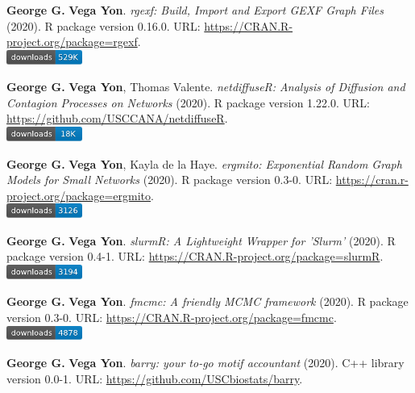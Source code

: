 \item {\bfseries George G.} {\bfseries Vega Yon}. \textit{rgexf: Build, Import and Export GEXF Graph Files} (2020). R package version 0.16.0. {\small URL}: \url{https://CRAN.R-project.org/package=rgexf}. \\\includegraphics[width=2.5cm]{fig/cran-downloads-rgexf.pdf} 
\item {\bfseries George G.} {\bfseries Vega Yon}, Thomas Valente. \textit{{{netdiffuseR: Analysis of Diffusion and Contagion Processes on Networks}}} (2020). R package version 1.22.0. {\small URL}: \url{https://github.com/USCCANA/netdiffuseR}. \\\includegraphics[width=2.5cm]{fig/cran-downloads-netdiffuser.pdf} 
\item {\bfseries George G.} {\bfseries Vega Yon}, Kayla de la Haye. \textit{ergmito: Exponential Random Graph Models for Small Networks} (2020). R package version 0.3-0. {\small URL}: \url{https://cran.r-project.org/package=ergmito}. \\\includegraphics[width=2.5cm]{fig/cran-downloads-ergmito.pdf} 
\item {\bfseries George G.} {\bfseries Vega Yon}. \textit{slurmR: A Lightweight Wrapper for 'Slurm'} (2020). R package version 0.4-1. {\small URL}: \url{https://CRAN.R-project.org/package=slurmR}. \\\includegraphics[width=2.5cm]{fig/cran-downloads-slurmr.pdf} 
\item {\bfseries George G.} {\bfseries Vega Yon}. \textit{fmcmc: A friendly MCMC framework} (2020). R package version 0.3-0. {\small URL}: \url{https://CRAN.R-project.org/package=fmcmc}. \\\includegraphics[width=2.5cm]{fig/cran-downloads-fmcmc.pdf} 
\item {\bfseries George G.} {\bfseries Vega Yon}. \textit{barry: your to-go motif accountant} (2020). C++ library version 0.0-1. {\small URL}: \url{https://github.com/USCbiostats/barry}.  
